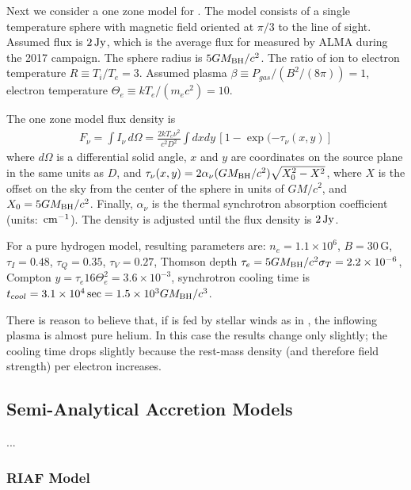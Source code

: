 Next we consider a one zone model for \sgra.
The model consists of a single temperature sphere with magnetic field
oriented at $\pi/3$ to the line of sight.
Assumed flux is $2{\rm \, Jy}$, which is the average flux for \sgra measured
by ALMA during the 2017 campaign.
The sphere radius is
$5 GM_{\rm BH}/c^2$.
The ratio of ion to electron temperature
$R \equiv T_i/T_e = 3$.
Assumed plasma
$\beta \equiv P_{gas}/(B^2/(8\pi)) = 1$,
electron temperature
$\Theta_e \equiv k T_e/(m_e c^2) = 10$.

The one zone model flux density is
\begin{align}
  F_\nu = \int I_\nu \, d\Omega =
  \frac{2 k T_e \nu^2}{c^2 D^2} \int dx dy\,\left[1-\exp(-\tau_\nu(x,y)\right]
\end{align}
where $d\Omega$ is a differential solid angle, $x$ and $y$ are
coordinates on the source plane in the same units as $D$, and
$\tau_\nu(x,y) = 2 \alpha_\nu (GM_{\rm BH}/c^2) \sqrt{X_0^2 - X^2}$,
where $X$ is the offset on the sky from the center of the sphere in
units of
$GM/c^2$, and $X_0 = 5 GM_{\rm BH}/c^2$.
Finally, $\alpha_\nu$ is the thermal synchrotron absorption
coefficient (units: ${\rm \, cm}^{-1}$).
The density is adjusted until the flux density is $2{\rm \, Jy}$.

For a pure hydrogen model, resulting parameters are: $n_e = 1.1 \times
10^6$, $B = 30\,\mathrm{G}$, $\tau_I = 0.48$, $\tau_Q = 0.35 $,
$\tau_V = 0.27$, Thomson depth $\tau_e = 5 GM_{\rm BH}/c^2 \sigma_T = 2.2
\times 10^{-6}$, Compton $y = \tau_e 16 \Theta_e^2 = 3.6 \times
10^{-3}$, synchrotron cooling time is $t_{cool} = 3.1 \times 10^4\sec
= 1.5 \times 10^3 GM_{\rm BH}/c^3$.

There is reason to believe that, if \sgra is fed by stellar winds as
in \citet{2019MNRAS.482L.123R}, the inflowing plasma is almost pure
helium.
In this case the results change only slightly; the cooling time drops
slightly because the rest-mass density (and therefore field strength)
per electron increases.

\subsection{Semi-Analytical Accretion Models}

...

\subsubsection{RIAF Model}

